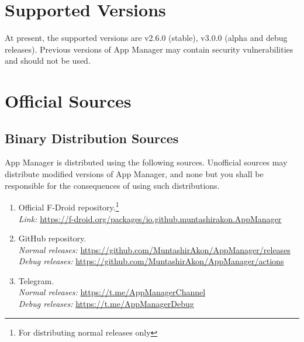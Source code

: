 \section{Supported Versions}\label{sec:supported-versions} %
At present, the supported versions are v2.6.0 (stable), v3.0.0 (alpha and debug releases). Previous versions of App
Manager may contain security vulnerabilities and should not be used.


\section{Official Sources}\label{sec:official-sources} %

\subsection{Binary Distribution Sources}\label{subsec:binary-distribution-sources} %
App Manager is distributed using the following sources. Unofficial sources may distribute modified versions of App
Manager, and none but you shall be responsible for the consequences of using such distributions.
\begin{enumerate}
    \item Official F-Droid repository.\footnote{For distributing normal releases only}\\
    \textit{Link:} \url{https://f-droid.org/packages/io.github.muntashirakon.AppManager}
    \item GitHub repository.\\
    \textit{Normal releases:} \url{https://github.com/MuntashirAkon/AppManager/releases}\\
    \textit{Debug releases:} \url{https://github.com/MuntashirAkon/AppManager/actions}
    \item Telegram.\\
    \textit{Normal releases:} \url{https://t.me/AppManagerChannel}\\
    \textit{Debug releases:} \url{https://t.me/AppManagerDebug}
\end{enumerate}

